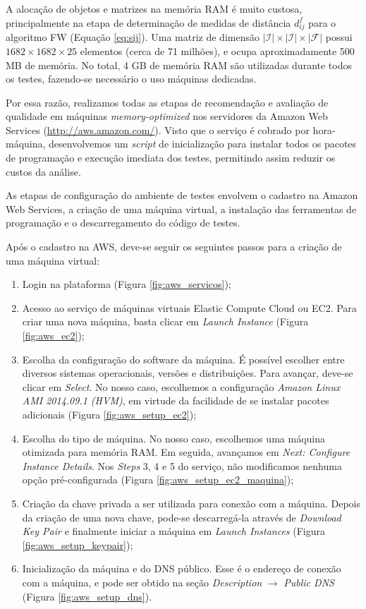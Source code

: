 A alocação de objetos e matrizes na memória RAM é muito custosa, principalmente na etapa de determinação de medidas de distância $d_{ij}^f$ para o algoritmo FW (Equação \ref{eq:sij}). Uma matriz de dimensão $\left|\mathcal{I}\right| \times\left|\mathcal{I}\right| \times\left|\mathcal{F}\right|$ possui $1682 \times 1682 \times 25$ elementos (cerca de 71 milhões), e ocupa aproximadamente 500 MB de memória. No total, 4 GB de memória RAM são utilizadas durante todos os testes, fazendo-se necessário o uso máquinas dedicadas.

Por essa razão, realizamos todas as etapas de recomendação e avaliação de qualidade em máquinas \textit{memory-optimized} nos servidores da Amazon Web Services (\url{http://aws.amazon.com/}). Visto que o serviço é cobrado por hora-máquina, desenvolvemos um \textit{script} de inicialização para instalar todos os pacotes de programação e execução imediata dos testes, permitindo assim reduzir os custos da análise.   

As etapas de configuração do ambiente de testes envolvem o cadastro na Amazon Web Services, a criação de uma máquina virtual, a instalação das ferramentas de programação e o descarregamento do código de testes.

Após o cadastro na AWS, deve-se seguir os seguintes passos para a criação de uma máquina virtual:

\begin{enumerate}
\item Login na plataforma (Figura \ref{fig:aws_servicos});
\item Acesso ao serviço de máquinas virtuais Elastic Compute Cloud ou EC2. Para criar uma nova máquina, basta clicar em \textit{Launch Instance} (Figura \ref{fig:aws_ec2});
\item Escolha da configuração do software da máquina. É possível escolher entre diversos sistemas operacionais, versões e distribuições. Para avançar, deve-se clicar em \textit{Select}. No nosso caso, escolhemos a configuração \textit{Amazon Linux AMI 2014.09.1 (HVM)}, em virtude da facilidade de se instalar pacotes adicionais  (Figura \ref{fig:aws_setup_ec2});
\item Escolha do tipo de máquina. No nosso caso, escolhemos uma máquina otimizada para memória RAM. Em seguida, avançamos em \textit{Next: Configure Instance Details}. Nos \textit{Steps} 3, 4 e 5 do serviço, não modificamos nenhuma opção pré-configurada (Figura \ref{fig:aws_setup_ec2_maquina});
\item Criação da chave privada a ser utilizada para conexão com a máquina. Depois da criação de uma nova chave, pode-se descarregá-la através de \textit{Download Key Pair} e finalmente iniciar a máquina em \textit{Launch Instances} (Figura \ref{fig:aws_setup_keypair});
\item Inicialização da máquina e do DNS público. Esse é o endereço de conexão com a máquina, e pode ser obtido na seção \textit{Description} $\rightarrow$ \textit{Public DNS} (Figura \ref{fig:aws_setup_dns}).
\end{enumerate}

